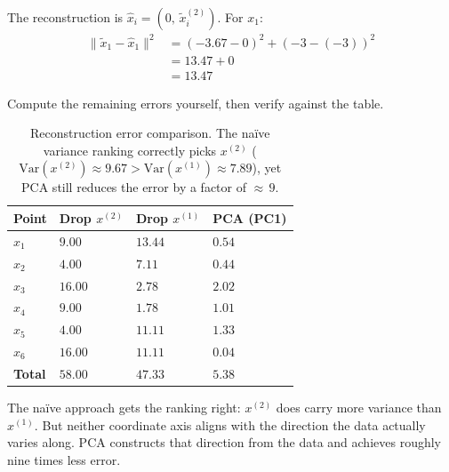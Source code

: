  The reconstruction is $\hat{x}_i = (0,\, \tilde{x}_i^{(2)})$.
For $x_1$:
\begin{align*}
    \|\tilde{x}_1 - \hat{x}_1\|^2 &= (-3.67-0)^2 + (-3-(-3))^2 \\
                                    &= 13.47 + 0 \\
                                    &= 13.47
\end{align*}

Compute the remaining errors yourself, then verify against the table.

\begin{table}[ht]
\centering
\begin{tabular}{p{}p{}p{}p{}}
    \toprule
    \textbf{Point} & \textbf{Drop $x^{(2)}$} & \textbf{Drop $x^{(1)}$} & \textbf{PCA (PC1)} \\
    \midrule
    $x_1$ & $9.00$  & $13.44$ & $0.54$ \\
    $x_2$ & $4.00$  & $7.11$  & $0.44$ \\
    $x_3$ & $16.00$ & $2.78$  & $2.02$ \\
    $x_4$ & $9.00$  & $1.78$  & $1.01$ \\
    $x_5$ & $4.00$  & $11.11$ & $1.33$ \\
    $x_6$ & $16.00$ & $11.11$ & $0.04$ \\
    \midrule
    \textbf{Total} & $\mathbf{58.00}$ & $\mathbf{47.33}$ & $\mathbf{5.38}$ \\
    \bottomrule
\end{tabular}
\vspace{2em}
\caption{Reconstruction error comparison. The na\"ive variance ranking correctly picks $x^{(2)}$ ($\text{Var}(x^{(2)}) \approx 9.67 > \text{Var}(x^{(1)}) \approx 7.89$), yet PCA still reduces the error by a factor of ${\approx}\,9$.}
\label{tab:naive_vs_pca}
\end{table}

The na\"ive approach gets the ranking right: $x^{(2)}$ does carry more variance than $x^{(1)}$.
But neither coordinate axis aligns with the direction the data actually varies along.
PCA constructs that direction from the data and achieves roughly nine times less error.




